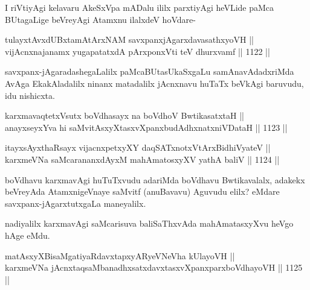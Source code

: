 \begin{artha}
I riVtiyAgi kelavaru AkeSxVpa mADalu ililx parxtiyAgi heVLide paMca BUtagaLige beVreyAgi Atamxnu ilalxdeV hoVdare-
\end{artha}

\begin{shl}
tulayxtAvxdUBxtamAtArxNAM savxpanxjAgarxdavasathxyoVH || \\
vijAcnxnajanamx yugapatatxdA pArxponxVti teV dhurxvamf ||  1122 ||  
\end{shl}

\begin{artha}
savxpanx-jAgaradashegaLalilx paMcaBUtasUkaSxgaLu samAnavAdadxriMda 
AvAga EkakAladalilx ninanx matadalilx jAcnxnavu huTaTx beVkAgi baruvudu, idu nishicxta.
\end{artha}


\begin{shl}
karxmavaqtetxVsutx boVdhasayx na boVdhoV BwtikasatxtaH || \\
anayxseyxYva hi saMvitAsxyXtasxvXpanxbudAdhxnatxniVDataH ||  1123 || 
\end{shl}
				
\begin{shl}
itayxsAyxthaRsayx vijacnxpetxyXY daqSATxnotxV\s tArxBidhiVyateV ||  \\
karxmeVNa saMcarananxdAyxM mahAmatosxyXV yathA baliV ||  1124 ||  
\end{shl}

\begin{artha}
boVdhavu karxmavAgi huTuTxvudu adariMda boVdhavu Bwtikavalalx, adakekx beVreyAda AtamxnigeVnaye saMvitf (anuBavavu) Aguvudu elilx? eMdare savxpanx-jAgarxtutxgaLa maneyalilx.
\end{artha}


\begin{artha}
nadiyalilx karxmavAgi saMcarisuva baliSaThxvAda mahAmatasxyXvu heVgo hAge eMdu.
\end{artha}

\begin{shl}
matAsxyXBisaMgatiyaRdavxtapxyARyeVNeVha kUlayoVH || \\
karxmeVNa jAcnxtaqsaMbanadhxsatxdavxtasxvXpanxparxboVdhayoVH ||  1125 ||  
\end{shl}

